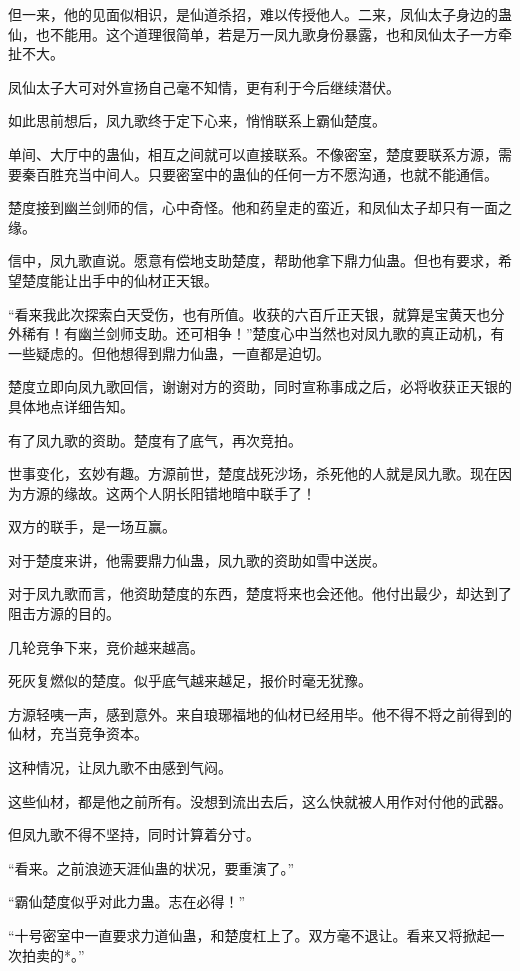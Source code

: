 \begin{this_body}
但一来，他的见面似相识，是仙道杀招，难以传授他人。二来，凤仙太子身边的蛊仙，也不能用。这个道理很简单，若是万一凤九歌身份暴露，也和凤仙太子一方牵扯不大。

凤仙太子大可对外宣扬自己毫不知情，更有利于今后继续潜伏。

如此思前想后，凤九歌终于定下心来，悄悄联系上霸仙楚度。

单间、大厅中的蛊仙，相互之间就可以直接联系。不像密室，楚度要联系方源，需要秦百胜充当中间人。只要密室中的蛊仙的任何一方不愿沟通，也就不能通信。

楚度接到幽兰剑师的信，心中奇怪。他和药皇走的蛮近，和凤仙太子却只有一面之缘。

信中，凤九歌直说。愿意有偿地支助楚度，帮助他拿下鼎力仙蛊。但也有要求，希望楚度能让出手中的仙材正天银。

“看来我此次探索白天受伤，也有所值。收获的六百斤正天银，就算是宝黄天也分外稀有！有幽兰剑师支助。还可相争！”楚度心中当然也对凤九歌的真正动机，有一些疑虑的。但他想得到鼎力仙蛊，一直都是迫切。

楚度立即向凤九歌回信，谢谢对方的资助，同时宣称事成之后，必将收获正天银的具体地点详细告知。

有了凤九歌的资助。楚度有了底气，再次竞拍。

世事变化，玄妙有趣。方源前世，楚度战死沙场，杀死他的人就是凤九歌。现在因为方源的缘故。这两个人阴长阳错地暗中联手了！

双方的联手，是一场互赢。

对于楚度来讲，他需要鼎力仙蛊，凤九歌的资助如雪中送炭。

对于凤九歌而言，他资助楚度的东西，楚度将来也会还他。他付出最少，却达到了阻击方源的目的。

几轮竞争下来，竞价越来越高。

死灰复燃似的楚度。似乎底气越来越足，报价时毫无犹豫。

方源轻咦一声，感到意外。来自琅琊福地的仙材已经用毕。他不得不将之前得到的仙材，充当竞争资本。

这种情况，让凤九歌不由感到气闷。

这些仙材，都是他之前所有。没想到流出去后，这么快就被人用作对付他的武器。

但凤九歌不得不坚持，同时计算着分寸。

“看来。之前浪迹天涯仙蛊的状况，要重演了。”

“霸仙楚度似乎对此力蛊。志在必得！”

“十号密室中一直要求力道仙蛊，和楚度杠上了。双方毫不退让。看来又将掀起一次拍卖的*。”


\end{this_body}
